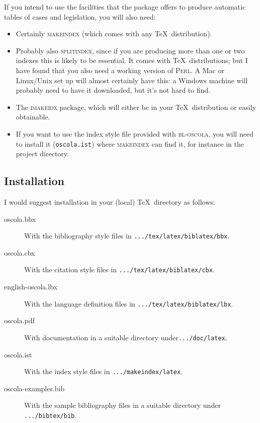 \documentclass[a4paper,
               11pt,
	       DIV=1,			   
	       footinclude=false]
	      {scrartcl}
\newcommand{\oscola}{\textsc{bl-oscola}}
\begin{document}
If you intend to use the facilities that the package offers to produce
automatic tables of cases and legislation, you will also need:
\begin{itemize}
\item Certainly \textsc{makeindex} (which comes with any \TeX\ distribution).
\item Probably also \textsc{splitindex}, since if you are producing
  more than one or two indexes this is likely to be essential. It
  comes with \TeX\ distributions; but I have found that you also need
  a working version of \textsc{Perl}. A Mac or Linux\slash Unix set up
  will almost certainly have this: a Windows machine will probably
  need to have it downloaded, but it's not hard to find.
\item The \textsc{imakeidx} package, which will either be in your
  \TeX\ distribution or easily obtainable.
\item If you want to use the index style file provided with \oscola,
  you will need to install it (\texttt{oscola.ist}) where
  \textsc{makeindex} can find it, for instance in the project
  directory.
\end{itemize}

\subsection{Installation}

I would suggest installation in your (local) \TeX\ directory as follows:
\begin{description}
\item[oscola.bbx] With the bibliography style files in \texttt{.../\allowbreak tex/\allowbreak latex/\linebreak biblatex/\allowbreak bbx}.
\item[oscola.cbx] With the citation style files in \texttt{.../tex/latex/\linebreak biblatex/cbx}.
\item[english-oscola.lbx] With the language definition files in \texttt{.../tex/latex/\linebreak biblatex/lbx}.
\item[oscola.pdf] With documentation in a suitable directory under\linebreak \texttt{.../doc/latex}.
\item[oscola.ist] With the index style files in \verb|.../makeindex/latex|.
\item[oscola-examples.bib] With the sample bibliography files in a suitable directory under \verb|.../bibtex/bib|.
\end{description}
\end{document}
